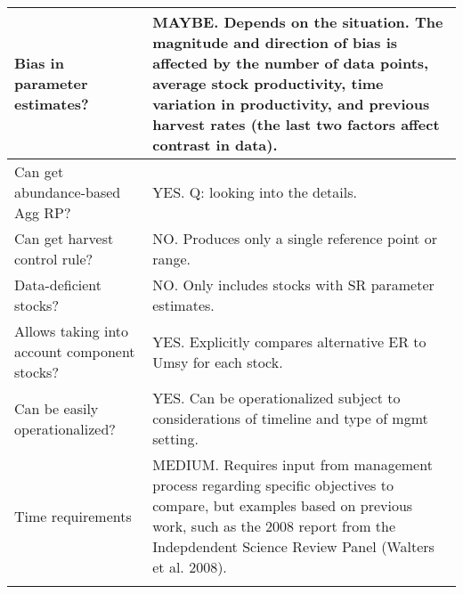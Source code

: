 \documentclass[french,11pt]{book}
\begin{document}
\begin{longtable}[t]{>{\raggedright\arraybackslash}p{9em}>{\raggedright\arraybackslash}p{37em}}
\midrule Bias in parameter estimates? & MAYBE.  Depends on the situation. The magnitude and direction of bias is affected by the number of data points, average stock productivity, time variation in productivity, and previous harvest rates (the last two factors affect contrast in data).\\
\midrule Can get abundance-based Agg RP? & YES.  Q: looking into the details.\\
\midrule Can get harvest control rule? & NO.  Produces only a single reference point or range.\\
\midrule Data-deficient stocks? & NO. Only includes stocks with SR parameter estimates.\\
\midrule Allows taking into account component stocks? & YES. Explicitly compares alternative ER to Umsy for each stock.\\
\midrule Can be easily operationalized? & YES. Can be operationalized subject to considerations of timeline and type of mgmt setting.\\
\midrule Time requirements & MEDIUM. Requires input from management process regarding specific objectives to compare, but examples based on previous work, such as the 2008 report from the Indepdendent Science Review Panel (Walters et al. 2008).\\* \end{longtable}

\endgroup{} \endgroup{}

\clearpage
\end{document}

